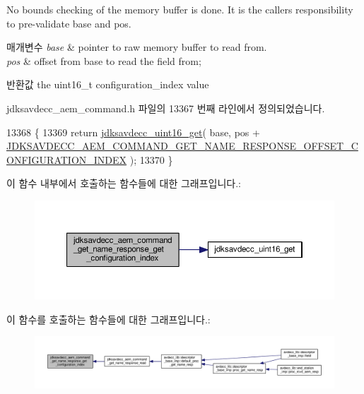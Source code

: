 No bounds checking of the memory buffer is done. It is the caller\textquotesingle{}s responsibility to pre-\/validate base and pos.


\begin{DoxyParams}{매개변수}
{\em base} & pointer to raw memory buffer to read from. \\
\hline
{\em pos} & offset from base to read the field from; \\
\hline
\end{DoxyParams}
\begin{DoxyReturn}{반환값}
the uint16\+\_\+t configuration\+\_\+index value 
\end{DoxyReturn}


jdksavdecc\+\_\+aem\+\_\+command.\+h 파일의 13367 번째 라인에서 정의되었습니다.


\begin{DoxyCode}
13368 \{
13369     \textcolor{keywordflow}{return} \hyperlink{group__endian_ga3fbbbc20be954aa61e039872965b0dc9}{jdksavdecc\_uint16\_get}( base, pos + 
      \hyperlink{group__command__get__name__response_gaf96b46923385d39208f35e8ef9a5c752}{JDKSAVDECC\_AEM\_COMMAND\_GET\_NAME\_RESPONSE\_OFFSET\_CONFIGURATION\_INDEX}
       );
13370 \}
\end{DoxyCode}


이 함수 내부에서 호출하는 함수들에 대한 그래프입니다.\+:
\nopagebreak
\begin{figure}[H]
\begin{center}
\leavevmode
\includegraphics[width=350pt]{group__command__get__name__response_ga02290070ea3ff9df2ea2276b2d105324_cgraph}
\end{center}
\end{figure}




이 함수를 호출하는 함수들에 대한 그래프입니다.\+:
\nopagebreak
\begin{figure}[H]
\begin{center}
\leavevmode
\includegraphics[width=350pt]{group__command__get__name__response_ga02290070ea3ff9df2ea2276b2d105324_icgraph}
\end{center}
\end{figure}


